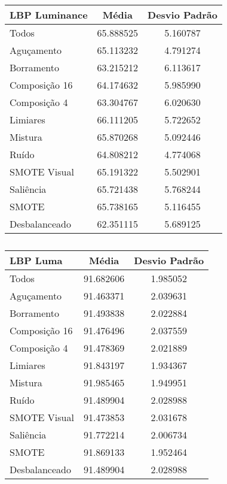 \begin{table}[!htbp]
\centering
\caption{}
\label{tab:resultados:x:melhor}
\begin{tabular}{|l|c|c|}
\hline
\textbf{LBP Luminance} & \textbf{Média}     & \textbf{Desvio Padrão} \\ \hline
   Todos        &  65.888525 &  5.160787  \\ \hline
  Aguçamento    &  65.113232 &  4.791274  \\ \hline
  Borramento    &  63.215212 &  6.113617  \\ \hline
  Composição 16 &  64.174632 &  5.985990  \\ \hline
  Composição 4  &  63.304767 &  6.020630  \\ \hline
  Limiares      &  66.111205 &  5.722652  \\ \hline
  Mistura       &  65.870268 &  5.092446  \\ \hline
  Ruído         &  64.808212 &  4.774068  \\ \hline
  SMOTE Visual  &  65.191322 &  5.502901  \\ \hline
  Saliência     &  65.721438 &  5.768244  \\ \hline
 SMOTE          &  65.738165 &  5.116455  \\ \hline
Desbalanceado   &  62.351115 &  5.689125  \\ \hline
\end{tabular}
\end{table}


\begin{table}[!htbp]
\centering
\caption{}
\label{tab:resultados:x:melhor}
\begin{tabular}{|l|c|c|}
\hline
\textbf{LBP Luma} & \textbf{Média}     & \textbf{Desvio Padrão} \\ \hline
   Todos        &  91.682606 &  1.985052  \\ \hline
  Aguçamento    &  91.463371 &  2.039631  \\ \hline
  Borramento    &  91.493838 &  2.022884  \\ \hline
  Composição 16 &  91.476496 &  2.037559  \\ \hline
  Composição 4  &  91.478369 &  2.021889  \\ \hline
  Limiares      &  91.843197 &  1.934367  \\ \hline
  Mistura       &  91.985465 &  1.949951  \\ \hline
  Ruído         &  91.489904 &  2.028988  \\ \hline
  SMOTE Visual  &  91.473853 &  2.031678  \\ \hline
  Saliência     &  91.772214 &  2.006734  \\ \hline
 SMOTE          &  91.869133 &  1.952464  \\ \hline
Desbalanceado   &  91.489904 &  2.028988  \\ \hline
\end{tabular}
\end{table}


